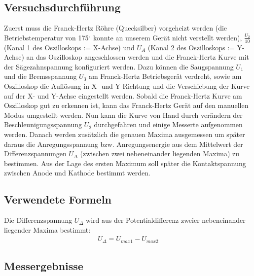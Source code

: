 \documentclass[12pt,a4paper]{article}
\begin{document}
\subsection{Versuchsdurchführung}
Zuerst muss die Franck-Hertz Röhre (Quecksilber) vorgeheizt werden (die Betriebstemperatur von 175$^{\circ}$ konnte an unserem Gerät nicht verstellt werden), $\frac{U_2}{10}$ (Kanal 1 des Oszilloskops := X-Achse) und $U_A$ (Kanal 2 des Oszilloskops := Y-Achse) an das Oszilloskop angeschlossen werden und die Franck-Hertz Kurve mit der Sägezahnspannung konfiguriert werden. Dazu können die Saugspannung $U_1$ und die Bremsspannung $U_3$ am Franck-Hertz Betriebsgerät verdreht, sowie
am Oszilloskop die Auflösung in X- und Y-Richtung und die Verschiebung der Kurve auf der X- und Y-Achse eingestellt werden.
Sobald die Franck-Hertz Kurve am Oszilloskop gut zu erkennen ist, kann das Franck-Hertz Gerät auf den manuellen Modus umgestellt werden. Nun kann die Kurve von Hand durch verändern der Beschleunigungsspannung $U_2$ durchgefahren und einige Messerte aufgenommen werden. Danach werden zusätzlich die genauen Maxima ausgemessen um später daraus die Anregungsspannung bzw. Anregungsenergie aus dem Mittelwert der Differenzspannungen $U_{\Delta}$ (zwischen zwei nebeneinander liegenden Maxima) zu bestimmen.
Aus der Lage des ersten Maximum soll später die Kontaktspannung zwischen Anode und Kathode bestimmt werden.
\subsection{Verwendete Formeln}
Die Differenzspannung $U_{\Delta}$ wird aus der Potentialdifferenz zweier nebeneinander liegender Maxima bestimmt:
\begin{align}
U_{\Delta} = U_{max1}-U_{max2}
\end{align}
\subsection{Messergebnisse}
\end{document}
